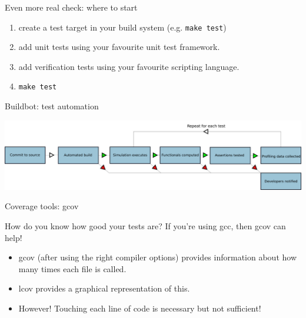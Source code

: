 \documentclass[t]{beamer}
\begin{document}
\begin{frame}{Even more real check: where to start}
  
  \begin{enumerate}
  \item create a test target in your build system (e.g. \texttt{make test})
  \item add unit tests using your favourite unit test framework.
  \item add verification tests using your favourite scripting language.
  \item \texttt{make test}\ 
  \end{enumerate}

\end{frame}

\begin{frame}{Buildbot: test automation}
  
  \begin{center}
    
    \includegraphics[width=\textwidth]{buildbot-simple.pdf}

  \end{center}

\end{frame}

\begin{frame}{Coverage tools: gcov}
  
  How do you know how good your tests are? If you're using gcc, then gcov can help!
  
  \begin{itemize}
  \item gcov (after using the right compiler options) provides information
    about how many times each file is called.
  \item lcov provides a graphical representation of this.
  \item However! Touching each line of code is necessary but not sufficient!
  \end{itemize}

\end{frame}
\end{document}
